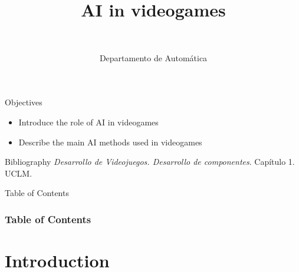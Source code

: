\documentclass[10pt,compress]{beamer} %
\title[AI in videogames]{AI in videogames}
\author{\asignatura\\\carrera}
\institute{}
\date{Departamento de Automática}
\begin{document}
{\titlepageBlue
    \begin{frame}
        \titlepage
    \end{frame}
}

\institute{\asignatura}

\begin{frame}[plain]{}
   \begin{block}{Objectives}
       \begin{itemize}
        \item Introduce the role of AI in videogames
        \item Describe the main AI methods used in videogames
       \end{itemize}
   \end{block}

   \begin{block}{Bibliography}
       \textit{Desarrollo de Videojuegos. Desarrollo de componentes}. Capítulo 1. UCLM.
   \end{block}
\end{frame}

{
\begin{frame}[shrink]{Table of Contents}
    \frametitle{Table of Contents}
  	\begin{multicols}{2}
    \tableofcontents
    \end{multicols}
\end{frame}
}

\section{Introduction}
\end{document}
